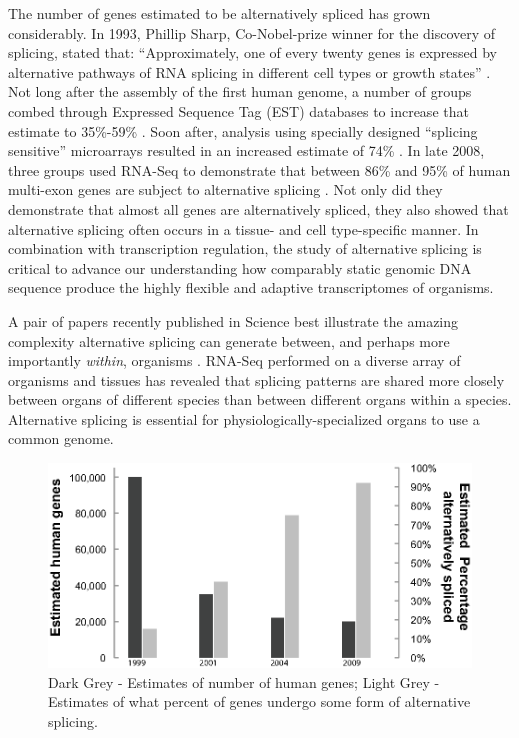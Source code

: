     The number of genes estimated to be alternatively spliced has grown considerably. In 1993, Phillip Sharp, Co-Nobel-prize winner for the discovery of splicing, stated that: ``Approximately, one of every twenty genes is expressed by alternative pathways of RNA splicing in different cell types or growth states'' \cite{Sharp2014}. Not long after the assembly of the first human genome, a number of groups combed through Expressed Sequence Tag (EST) databases to increase that estimate to 35\%-59\% \citep{Modrek2002}. Soon after, analysis using specially designed ``splicing sensitive'' microarrays resulted in an increased estimate of 74\% \citep{Johnson2003}. In late 2008, three groups used RNA-Seq to demonstrate that between 86\% and 95\% of human multi-exon genes are subject to alternative splicing \citep{Pan2008, Wang2008, Sultan2008}. Not only did they demonstrate that almost all genes are alternatively spliced, they also showed that alternative splicing often occurs in a tissue- and cell type-specific manner. In combination with transcription regulation, the study of alternative splicing is critical to advance our understanding how comparably static genomic DNA sequence produce the highly flexible and adaptive transcriptomes of organisms.

    A pair of papers recently published in Science best illustrate the amazing complexity alternative splicing can generate between, and perhaps more importantly \textit{within}, organisms \citep{Barbosa-Morais2012,Merkin2012}. RNA-Seq performed on a diverse array of organisms and tissues has revealed that splicing patterns are shared more closely between organs of different species than between different organs within a species. Alternative splicing is essential for physiologically-specialized organs to use a common genome.

    \begin{figure} %
      \centering
      \includegraphics{Figures/Intro/numberHumanGenesAndNumberSpliced}
      \caption[Estimates of number of human genes, and percentage alternatively spliced over time]
      {
      Dark Grey - Estimates of number of human genes; Light Grey - Estimates of what percent of genes undergo some form of alternative splicing.
      }
      \label{Intro:fig:numGenesAndNumSpliced}
      \end{figure}

